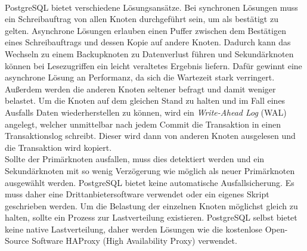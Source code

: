 \paragraph{}
PostgreSQL bietet verschiedene Lösungsansätze.
Bei synchronen Lösungen muss ein Schreibauftrag von allen Knoten durchgeführt sein, um als bestätigt zu gelten.
Asynchrone Lösungen erlauben einen Puffer zwischen dem Bestätigen eines Schreibauftrags und dessen Kopie auf andere Knoten.
Dadurch kann das Wechseln zu einem Backupknoten zu Datenverlust führen und Sekundärknoten können bei Lesezugriffen ein leicht veraltetes Ergebnis liefern.
Dafür gewinnt eine asynchrone Lösung an Performanz, da sich die Wartezeit stark verringert.
Außerdem werden die anderen Knoten seltener befragt und damit weniger belastet.
Um die Knoten auf dem gleichen Stand zu halten und im Fall eines Ausfalls Daten wiederherstellen zu können, wird ein \textit{Write-Ahead Log} (WAL) angelegt, welcher unmittelbar nach jedem Commit die Transaktion in einen Transaktionslog schreibt.
Dieser wird dann von anderen Knoten ausgelesen und die Transaktion wird kopiert. \cite{PG1}\\
Sollte der Primärknoten ausfallen, muss dies detektiert werden und ein Sekundärknoten mit so wenig Verzögerung wie möglich als neuer Primärknoten ausgewählt werden.
PostgreSQL bietet keine automatische Ausfallsicherung.
Es muss daher eine Drittanbietersoftware verwendet oder ein eigenes Skript geschrieben werden.
Um die Belastung der einzelnen Knoten möglichst gleich zu halten, sollte ein Prozess zur Lastverteilung existieren.
PostgreSQL selbst bietet keine native Lastverteilung, daher werden Lösungen wie die kostenlose Open-Source Software HAProxy (High Availability Proxy) verwendet. %

